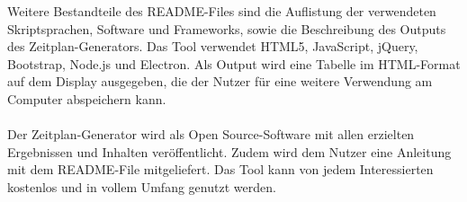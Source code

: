 Weitere Bestandteile des README-Files sind die Auflistung der verwendeten Skriptsprachen, Software und Frameworks, sowie die Beschreibung des Outputs des Zeitplan-Generators. Das Tool verwendet HTML5, JavaScript, jQuery, Bootstrap, Node.js und Electron. Als Output wird eine Tabelle im HTML-Format auf dem Display ausgegeben, die der Nutzer für eine weitere Verwendung am Computer abspeichern kann.\\
\\
Der Zeitplan-Generator wird als Open Source-Software mit allen erzielten Ergebnissen und Inhalten veröffentlicht. Zudem wird dem Nutzer eine Anleitung mit dem README-File mitgeliefert. Das Tool kann von jedem Interessierten kostenlos und in vollem Umfang genutzt werden.



